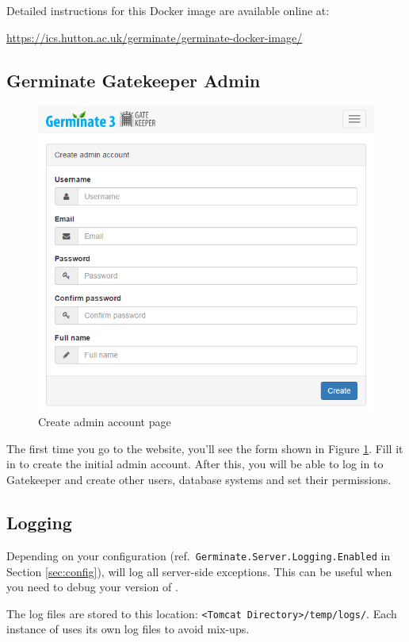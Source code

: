 Detailed instructions for this Docker image are available online at:

\begin{center}
	\url{https://ics.hutton.ac.uk/germinate/germinate-docker-image/}
\end{center}

\subsection{Germinate Gatekeeper Admin}
\label{subsection:gatekeeper-admin}

\begin{figure}
	\centering
	\includegraphics[scale=0.4]{img/setup/create-admin.png}
	\caption{Create admin account page}
	\label{fig:create-admin}
\end{figure}

The first time you go to the {\gatekeeper} website, you'll see the form shown in Figure \ref{fig:create-admin}. Fill it in to create the initial admin account. After this, you will be able to log in to Gatekeeper and create other users, database systems and set their permissions.

\subsection{Logging}
\label{subsection:logging}
Depending on your configuration (ref.\ \texttt{Germinate.Server.Logging.Enabled} in Section \ref{sec:config}), {\germinate} will log all server-side exceptions. This can be useful when you need to debug your version of {\germinate}.

The log files are stored to this location: \texttt{<Tomcat Directory>/temp/logs/}. Each instance of {\germinate} uses its own log files to avoid mix-ups.
